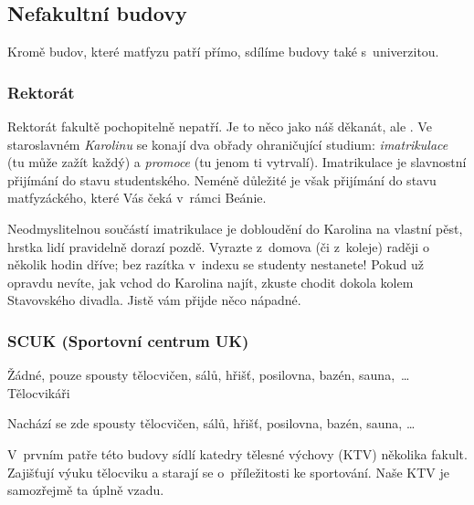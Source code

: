 \subsection{Nefakultní budovy}
Kromě budov, které matfyzu patří přímo, sdílíme budovy také s~univerzitou.

\subsubsection{Rektorát}


Rektorát fakultě pochopitelně nepatří. Je to něco jako náš
děkanát, ale .  Ve staroslavném {\it Karolinu\/}
se konají dva obřady ohraničující studium: {\it imatrikulace\/}
(tu může zažít každý) a {\it promoce\/} (tu jenom ti vytrvalí).
Imatrikulace je slavnostní přijímání do stavu studentského. Neméně
důležité je však přijímání do stavu matfyzáckého, které Vás čeká
v~rámci Beánie. 

Neodmyslitelnou součástí imatrikulace je
dobloudění do Karolina na vlastní pěst, hrstka lidí pravidelně
dorazí pozdě. Vyrazte z~domova (či z~koleje) raději o několik
hodin dříve; bez razítka  v~indexu se
studenty nestanete! Pokud už opravdu nevíte, jak vchod do Karolina
najít, zkuste chodit dokola kolem Stavovského divadla. Jistě vám
přijde něco nápadné.

\subsubsection{SCUK (Sportovní centrum UK)}

 {Žádné, pouze spousty tělocvičen, sálů, hřišť,
posilovna, bazén, sau\-na,~\dots}{Tělocvikáři}


Nachází se zde spousty tělocvičen, sálů, hřišť, posilovna, bazén, sauna, \dots

V~prvním patře této budovy sídlí katedry tělesné výchovy (KTV)
několika fakult. Zajišťují výuku tělocviku a starají se
o~příležitosti ke sportování. Naše KTV je samozřejmě ta úplně
vzadu.

